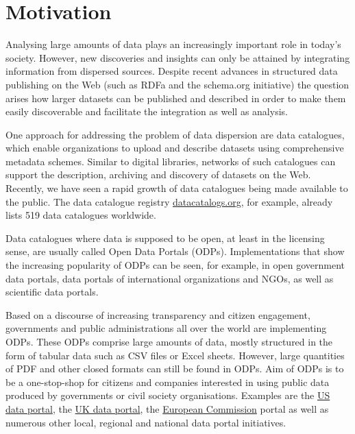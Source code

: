 \section{Motivation}

Analysing large amounts of data plays an increasingly important role in today's society. 
However, new discoveries and insights can only be attained by integrating information from dispersed sources. 
Despite recent advances in structured data publishing on the Web (such as RDFa and the schema.org initiative) the question arises how larger datasets can be published and described in order to make them easily discoverable and facilitate the integration as well as analysis.

One approach for addressing the problem of data dispersion are data catalogues, which enable organizations to upload and describe datasets using comprehensive metadata schemes. 
Similar to digital libraries, networks of such catalogues can support the description, archiving and discovery of datasets on the Web. 
Recently, we have seen a rapid growth of data catalogues being made available to the public. 
The data catalogue registry \href{http://datacatalogs.org}{datacatalogs.org}, for example, already lists 519 data catalogues worldwide. 

Data catalogues where data is supposed to be open, at least in the licensing sense, are usually called Open Data Portals (ODPs).
Implementations that show the increasing popularity of ODPs can be seen, for example, in open government data portals, data portals of international organizations and NGOs, as well as scientific data portals.

Based on a discourse of increasing transparency and citizen engagement, governments and public administrations all over the world are implementing ODPs. 
These ODPs comprise large amounts of data, mostly structured in the form of tabular data such as CSV files or Excel sheets.
However, large quantities of PDF and other closed formats can still be found in ODPs.
Aim of ODPs is to be a one-stop-shop for citizens and companies interested in using public data produced by governments or civil society organisations.
Examples are the \href{http://data.gov}{US data portal}, the \href{http://data.gov.uk}{UK data portal}, the \href{http://open-data.europa.eu}{European Commission} portal as well as numerous other local, regional and national data portal initiatives.

